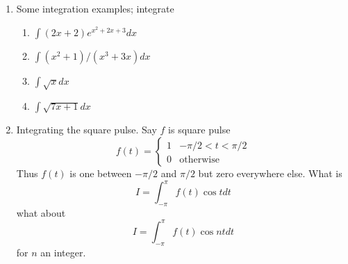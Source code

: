 \documentclass[12pt]{article}
\begin{document}
\begin{enumerate}
\item Some integration examples; integrate
\begin{enumerate}
\item $\int (2x+2)e^{x^2+2x+3}dx$
\item $\int (x^2+1)/(x^3+3x)dx$
\item $\int \sqrt{x}dx$
\item $\int \sqrt{7x+1}dx$
\end{enumerate}

\item Integrating the square pulse. Say $f$ is square pulse
\begin{equation}
f(t)=\left\{\begin{array}{ll}1&-\pi/2<t<\pi/2\\0&\mbox{otherwise}\end{array}\right.
\end{equation}
Thus $f(t)$ is one between $-\pi/2$ and $\pi/2$ but zero everywhere else. What is
\begin{equation}
I=\int_{-\pi}^\pi f(t)\cos{t}dt
\end{equation}
what about
\begin{equation}
I=\int_{-\pi}^\pi f(t)\cos{nt}dt
\end{equation}
for $n$ an integer.
\end{enumerate}
\end{document}
